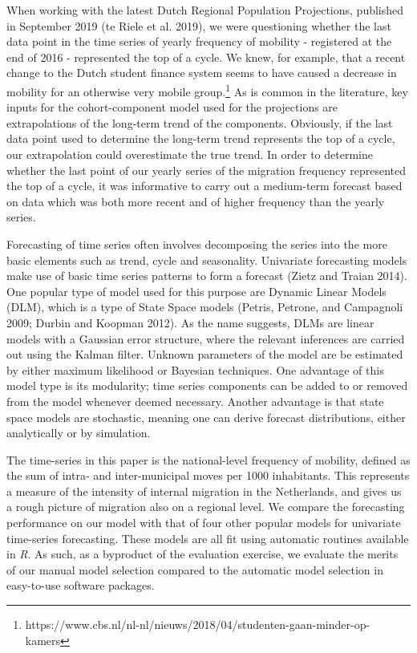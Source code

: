 \documentclass[]{article}
\let\rmarkdownfootnote\footnote%
\def\footnote{\protect\rmarkdownfootnote}
\begin{document}
When working with the latest Dutch Regional Population Projections,
published in September 2019 (te Riele et al. 2019), we were questioning
whether the last data point in the time series of yearly frequency of
mobility - registered at the end of 2016 - represented the top of a
cycle. We knew, for example, that a recent change to the Dutch student
finance system seems to have caused a decrease in mobility for an
otherwise very mobile
group.\footnote{https://www.cbs.nl/nl-nl/nieuws/2018/04/studenten-gaan-minder-op-kamers}
As is common in the literature, key inputs for the cohort-component
model used for the projections are extrapolations of the long-term trend
of the components. Obviously, if the last data point used to determine
the long-term trend represents the top of a cycle, our extrapolation
could overestimate the true trend. In order to determine whether the
last point of our yearly series of the migration frequency represented
the top of a cycle, it was informative to carry out a medium-term
forecast based on data which was both more recent and of higher
frequency than the yearly series.

Forecasting of time series often involves decomposing the series into
the more basic elements such as trend, cycle and seasonality. Univariate
forecasting models make use of basic time series patterns to form a
forecast (Zietz and Traian 2014). One popular type of model used for
this purpose are Dynamic Linear Models (DLM), which is a type of State
Space models (Petris, Petrone, and Campagnoli 2009; Durbin and Koopman
2012). As the name suggests, DLMs are linear models with a Gaussian
error structure, where the relevant inferences are carried out using the
Kalman filter. Unknown parameters of the model are be estimated by
either maximum likelihood or Bayesian techniques. One advantage of this
model type is its modularity; time series components can be added to or
removed from the model whenever deemed necessary. Another advantage is
that state space models are stochastic, meaning one can derive forecast
distributions, either analytically or by simulation.

The time-series in this paper is the national-level frequency of
mobility, defined as the sum of intra- and inter-municipal moves per
1000 inhabitants. This represents a measure of the intensity of internal
migration in the Netherlands, and gives us a rough picture of migration
also on a regional level. We compare the forecasting performance on our
model with that of four other popular models for univariate time-series
forecasting. These models are all fit using automatic routines available
in \emph{R}. As such, as a byproduct of the evaluation exercise, we
evaluate the merits of our manual model selection compared to the
automatic model selection in easy-to-use software packages.
\end{document}

